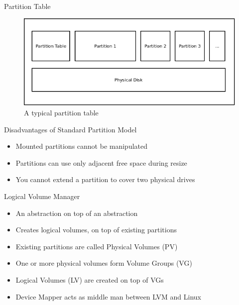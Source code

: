 \documentclass{beamer}
\begin{document}
\begin{frame}{Partition Table}
    \begin{figure}
        \includegraphics[scale=0.45]{partitions.png}
        \caption{A typical partition table}
    \end{figure}
\end{frame}

\begin{frame}{Disadvantages of Standard Partition Model}
    \begin{itemize}
        \item<2-> Mounted partitions cannot be manipulated 
        \item<3-> Partitions can use only adjacent free space during resize
        \item<4-> You cannot extend a partition to cover two physical drives
    \end{itemize}
\end{frame}

\begin{frame}{Logical Volume Manager}
    \begin{itemize}
        \item<2-> An abstraction on top of an abstraction
        \item<3-> Creates logical volumes, on top of existing partitions
        \item<4-> Existing partitions are called Physical Volumes (PV)
        \item<5-> One or more physical volumes form Volume Groups (VG)
        \item<6-> Logical Volumes (LV) are created on top of VGs
        \item<7-> Device Mapper acts as middle man between LVM and Linux
    \end{itemize}
\end{frame}
\end{document}
